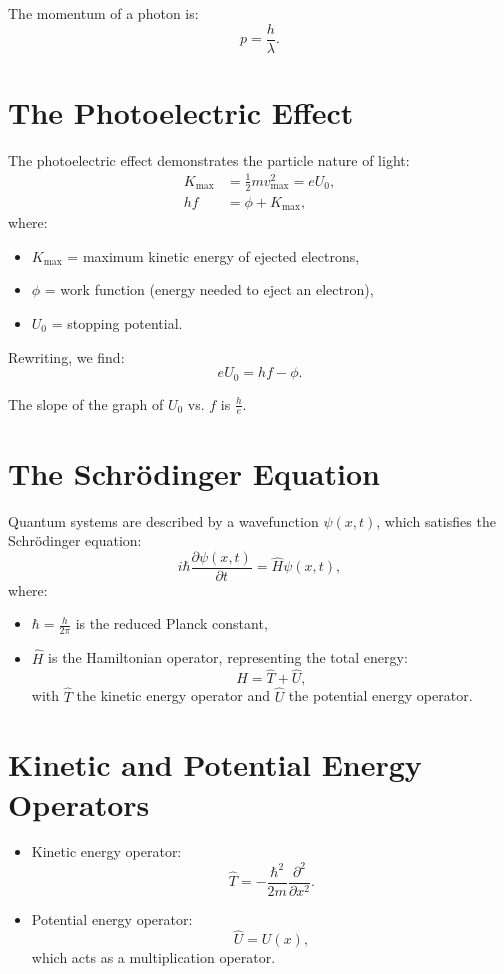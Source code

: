 \documentclass[a4paper,12pt]{article}
\begin{document}
\begin{multicols}{2}
The momentum of a photon is:
\[
p = \frac{h}{\lambda}.
\]

\section*{The Photoelectric Effect}
The photoelectric effect demonstrates the particle nature of light:
\begin{align*}
K_\text{max} &= \frac{1}{2} mv_\text{max}^2 = eU_0, \\
hf &= \phi + K_\text{max},
\end{align*}
where:
\begin{itemize}
    \item $K_\text{max}$ = maximum kinetic energy of ejected electrons,
    \item $\phi$ = work function (energy needed to eject an electron),
    \item $U_0$ = stopping potential.
\end{itemize}
Rewriting, we find:
\[
eU_0 = hf - \phi.
\]

The slope of the graph of $U_0$ vs. $f$ is $\frac{h}{e}$.

\section*{The Schrödinger Equation}
Quantum systems are described by a wavefunction $\psi(x,t)$, which satisfies the Schrödinger equation:
\[
i\hbar \frac{\partial \psi(x,t)}{\partial t} = \hat{H} \psi(x,t),
\]
where:
\begin{itemize}
    \item $\hbar = \frac{h}{2\pi}$ is the reduced Planck constant,
    \item $\hat{H}$ is the Hamiltonian operator, representing the total energy:
    \[
    \hat{H} = \hat{T} + \hat{U},
    \]
    with $\hat{T}$ the kinetic energy operator and $\hat{U}$ the potential energy operator.
\end{itemize}

\section*{Kinetic and Potential Energy Operators}
\begin{itemize}
    \item Kinetic energy operator:
    \[
    \hat{T} = -\frac{\hbar^2}{2m} \frac{\partial^2}{\partial x^2}.
    \]
    \item Potential energy operator:
    \[
    \hat{U} = U(x),
    \]
    which acts as a multiplication operator.
\end{itemize}


\end{multicols}
\end{document}
